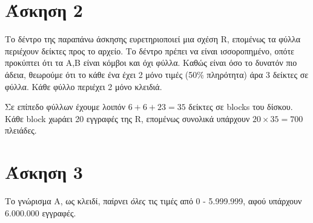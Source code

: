 \documentclass[a4paper,11pt]{article}
\begin{document}

\section{Άσκηση 2}
Το δέντρο της παραπάνω άσκησης ευρετηριοποιεί μια σχέση R, επομένως τα φύλλα
περιέχουν δείκτες προς το αρχείο. Το δέντρο πρέπει να είναι ισσοροπημένο,
οπότε προκύπτει ότι τα Α,Β είναι κόμβοι και όχι φύλλα. Καθώς είναι όσο το
δυνατόν πιο άδεια, θεωρούμε ότι το κάθε ένα έχει 2 μόνο τιμές (50\% πληρότητα)
άρα 3 δείκτες σε φύλλα. Κάθε φύλλο περιέχει 2 μόνο κλειδιά.

Σε επίπεδο φύλλων έχουμε λοιπόν $6 + 6 + 23 = 35$ δείκτες σε blocks του δίσκου.
Κάθε block χωράει 20 εγγραφές της R, επομένως συνολικά υπάρχουν
$20 \times 35 = 700$ πλειάδες.
\pagebreak

\section{Άσκηση 3}

Το γνώρισμα Α, ως κλειδί, παίρνει \emph{όλες} τις τιμές από 0 - 5.999.999,
αφού υπάρχουν 6.000.000 εγγραφές.
\end{document}
